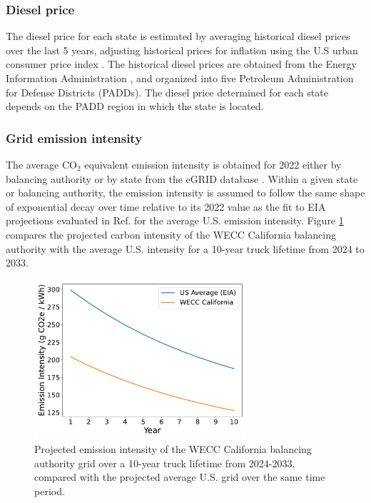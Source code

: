 \subsubsection{Diesel price}

The diesel price for each state is estimated by averaging historical diesel prices over the last 5 years, adjusting historical prices for inflation using the U.S urban consumer price index \cite{cpi_2024}. The historical diesel prices are obtained from the Energy Information Administration \cite{eia2024gasdiesel}, and organized into five Petroleum Administration for Defense Districts (PADDs). The diesel price determined for each state depends on the PADD region in which the state is located.

\subsubsection{Grid emission intensity}

The average CO$_2$ equivalent emission intensity is obtained for 2022 either by balancing authority or by state from the eGRID database \cite{eGRID_2022}. Within a given state or balancing authority, the emission intensity is assumed to follow the same shape of exponential decay over time relative to its 2022 value as the fit to EIA projections evaluated in Ref. \cite{Sader_2023} for the average U.S. emission intensity. Figure \ref{fig:emission_intensity_exp} compares the projected carbon intensity of the WECC California balancing authority with the average U.S. intensity for a 10-year truck lifetime from 2024 to 2033. 

\begin{figure}[H]
        \centering
        \includegraphics[width=0.7\textwidth]{figures/grid_emission_intensity_projection_CAMX.pdf}
        \caption{Projected emission intensity of the WECC California balancing authority grid over a 10-year truck lifetime from 2024-2033, compared with the projected average U.S. grid over the same time period.}
        \label{fig:emission_intensity_exp}
\end{figure}

